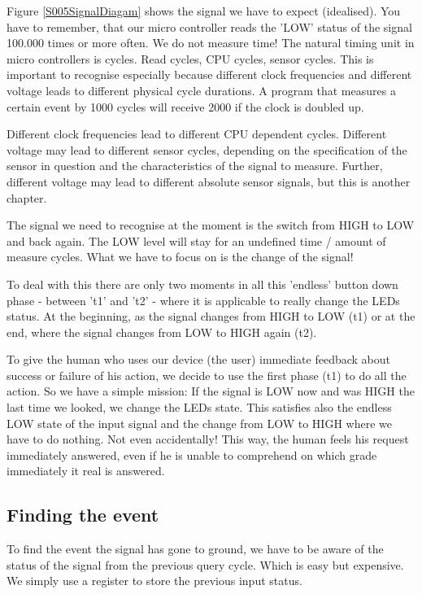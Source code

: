 Figure \ref{S005SignalDiagam} shows the signal we have to expect (idealised). You have to remember, that our micro controller reads the 'LOW' status of the signal 100.000 times or more often. We do not measure time! The natural timing unit in micro controllers is cycles. Read cycles, CPU cycles, sensor cycles. This is important to recognise especially because different clock frequencies and different voltage leads to different physical cycle durations. A program that measures a certain event by 1000 cycles will receive 2000 if the clock is doubled up.

Different clock frequencies lead to different CPU dependent cycles. Different voltage may lead to different sensor cycles, depending on the specification of the sensor in question and the characteristics of the signal to measure. Further, different voltage may lead to different absolute sensor signals, but this is another chapter.

The signal we need to recognise at the moment is the switch from HIGH to LOW and back again. The LOW level will stay for an undefined time / amount of measure cycles. What we have to focus on is the change of the signal!

To deal with this there are only two moments in all this 'endless' button down phase - between 't1' and 't2' - where it is applicable to really change the LEDs status. At the beginning, as the signal changes from HIGH to LOW (t1) or at the end, where the signal changes from LOW to HIGH again (t2).

To give the human who uses our device (the user) immediate feedback about success or failure of his action, we decide to use the first phase (t1) to do all the action. So we have a simple mission: If the signal is LOW now and was HIGH the last time we looked, we change the LEDs state. This satisfies also the endless LOW state of the input signal and the change from LOW to HIGH where we have to do nothing. Not even accidentally! This way, the human feels his request immediately answered, even if he is unable to comprehend on which grade immediately it real is answered.


\subsection{Finding the event}

To find the event the signal has gone to ground, we have to be aware of the status of the signal from the previous query cycle. Which is easy but expensive. We simply use a register to store the previous input status.

